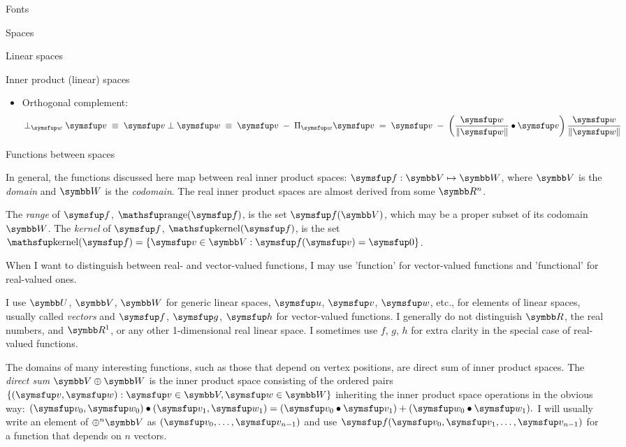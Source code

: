 \documentclass[12pt]{PalisadesLakesArticle}
\begin{document}
\begin{plSection}{Fonts}
\begin{plSection}{Spaces}
\begin{plSection}{Linear spaces}
\begin{plSection}{Inner product (linear) spaces}
\begin{itemize}
\item Orthogonal complement:
\begin{equation}
\perp_{\Vector{w}} \Vector{v}
\; \equiv \;
\Vector{v} \perp \Vector{w}
\; \equiv \;
\Vector{v} \; - \; \Projection_{\Vector{w}} \Vector{v}
\; = \;
\Vector{v} \; - \; 
\left( 
\frac{\Vector{w}}{\|\Vector{w}\|} \bullet \Vector{v} 
\right) 
\frac{\Vector{w}}{\|\Vector{w}\|}
\end{equation}

\end{itemize}
\end{plSection}%
\end{plSection}%
\begin{plSection}{Functions between spaces}
\label{sec:Functions-between-spaces}

In general, the functions discussed here map between real inner product spaces:
$\Vector{f}:\Space{V} \mapsto \Space{W}$, where $\Space{V}$ is the
\textit{domain} and $\Space{W}$ is the \textit{codomain}.
The real inner product spaces are almost derived from some $\Reals^n$.

The \textit{range} of 
$\Vector{f}$, $\range(\Vector{f})$, is the set $\Vector{f}(\Space{V})$,
which may be a proper subset of its codomain $\Space{W}$.
The \textit{kernel} of
 $\Vector{f}$, $\kernel(\Vector{f})$, is the set
$\kernel(\Vector{f}) = \{ \Vector{v} \in \Space{V}
 : \Vector{f}(\Vector{v}) = \Vector{0} \}$.

When I want to distinguish between real- and vector-valued functions,
I may use 'function' for vector-valued functions and
'functional' for real-valued ones.

I use $\Space{U}$, $\Space{V}$, $\Space{W}$ for generic linear spaces,
$\Vector{u}$, $\Vector{v}$, $\Vector{w}$, etc., for elements of linear spaces,
usually called \textit{vectors}
and
$\Vector{f}$, $\Vector{g}$, $\Vector{h}$ for vector-valued functions.
I generally do not distinguish $\Reals$, the real numbers,
and $\Reals^1$, or any other 1-dimensional real linear space.
I sometimes use $f$, $g$, $h$ for extra clarity in the special
case of real-valued functions.

The domains of many interesting functions,
such as those that depend on vertex positions,
are direct sum of inner product spaces.
The \textit{direct sum} $\Space{V} \oplus \Space{W}$ is the inner product space
consisting of the ordered pairs 
$\{ (\Vector{v},\Vector{w}) : 
\Vector{v} \in \Space{V}, \Vector{w} \in \Space{W} \}$
inheriting the inner product space operations in the obvious way:
$(\Vector{v}_0,\Vector{w}_0) \bullet (\Vector{v}_1,\Vector{w}_1) 
= (\Vector{v}_0 \bullet \Vector{v}_1) 
+ (\Vector{w}_0 \bullet \Vector{w}_1).$
I will usually write an element of $\oplus^n \Space{V}$ as
$(\Vector{v}_0,\ldots,\Vector{v}_{n-1})$
and use
$\Vector{f}(\Vector{v}_0,\Vector{v}_1,\ldots,\Vector{v}_{n-1})$
for a function that depends on $n$ vectors.


\end{plSection}
\end{plSection}
\end{plSection}
\end{document}
